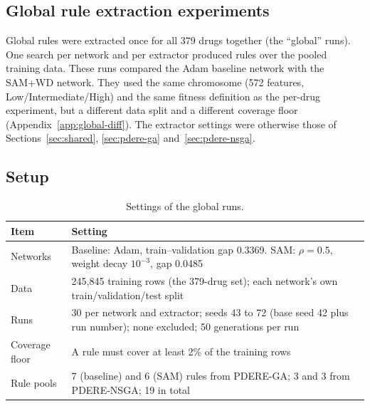 
\begin{appendices}

\setcounter{table}{0}
\renewcommand{\thetable}{A\arabic{table}}
\renewcommand{\theHtable}{A\arabic{table}}  %

\section{Global rule extraction experiments}
\label{app:global}

Global rules were extracted once for all 379 drugs together (the ``global'' runs). One search per network and per extractor produced rules over the pooled training data. These runs compared the Adam baseline network with the SAM+WD network. They used the same chromosome (572 features, Low/Intermediate/High) and the same fitness definition as the per-drug experiment, but a different data split and a different coverage floor (Appendix~\ref{app:global-diff}). The extractor settings were otherwise those of Sections~\ref{sec:shared}, \ref{sec:pdere-ga} and~\ref{sec:pdere-nsga}.

\subsection{Setup}
\label{app:global-setup}

\begin{table}[H]
\centering
\small
\caption{Settings of the global runs.}
\label{tab:A1}
\begin{tabularx}{\textwidth}{@{}lY@{}}
\toprule
\textbf{Item} & \textbf{Setting} \\
\midrule
Networks & Baseline: Adam, train--validation gap 0.3369. SAM: $\rho = 0.5$, weight decay $10^{-3}$, gap 0.0485 \\
Data & 245,845 training rows (the 379-drug set); each network's own train/validation/test split \\
Runs & 30 per network and extractor; seeds 43 to 72 (base seed 42 plus run number); none excluded; 50 generations per run \\
Coverage floor & A rule must cover at least 2\% of the training rows \\
Rule pools & 7 (baseline) and 6 (SAM) rules from PDERE-GA; 3 and 3 from PDERE-NSGA; 19 in total \\
\bottomrule
\end{tabularx}
\end{table}


\end{appendices}
